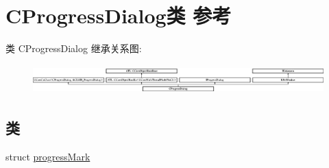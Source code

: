 \hypertarget{class_c_progress_dialog}{}\section{C\+Progress\+Dialog类 参考}
\label{class_c_progress_dialog}
类 C\+Progress\+Dialog 继承关系图\+:\begin{figure}[H]
\begin{center}
\leavevmode
\includegraphics[height=1.138211cm]{class_c_progress_dialog}
\end{center}
\end{figure}
\subsection*{类}
\begin{DoxyCompactItemize}
\item 
struct \hyperlink{struct_c_progress_dialog_1_1progress_mark}{progress\+Mark}
\end{DoxyCompactItemize}
